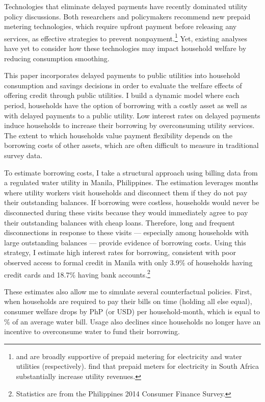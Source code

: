 \documentclass[12pt]{article}
\begin{document}
Technologies that eliminate delayed payments have recently dominated utility policy discussions.    Both researchers and policymakers recommend new prepaid metering technologies, which require upfront payment before releasing any services, as effective strategies to prevent nonpayment.\footnote{\cite{kojima2016making} and \cite{heymans2014limits} are broadly supportive of prepaid metering for electricity and water utilities (respectively).  \cite{jack2016charging} find that prepaid meters for electricity in South Africa substantially increase utility revenues.}    Yet, existing analyses have yet to consider how these technologies may impact household welfare by reducing consumption smoothing.

This paper incorporates delayed payments to public utilities into household consumption and savings decisions in order to evaluate the welfare effects of offering credit through public utilities.  I build a dynamic model where each period, households have the option of borrowing with a costly asset as well as with delayed payments to a public utility.  Low interest rates on delayed payments induce households to increase their borrowing by overconsuming utility services.  The extent to which households value payment flexibility depends on the borrowing costs of other assets, which are often difficult to measure in traditional survey data.

To estimate borrowing costs, I take a structural approach using billing data from a regulated water utility in Manila, Philippines.  The estimation leverages months where utility workers visit households and disconnect them if they do not pay their outstanding balances.  If borrowing were costless, households would never be disconnected during these visits because they would immediately agree to pay their outstanding balances with cheap loans.  Therefore, long and frequent disconnections in response to these visits --- especially among households with large outstanding balances --- provide evidence of borrowing costs.  Using this strategy, I estimate high interest rates for borrowing, consistent with poor observed access to formal credit in Manila with only 3.9\% of households having credit cards and 18.7\% having bank accounts.\footnote{Statistics are from the Philippines 2014 Consumer Finance Survey.}  

These estimates also allow me to simulate several counterfactual policies.  First, when households are required to pay their bills on time (holding all else equal), consumer welfare drops by PhP (or USD) per household-month, which is equal to \unskip\% of an average water bill.  Usage also declines since households no longer have an incentive to overconsume water to fund their borrowing.  
\end{document}
